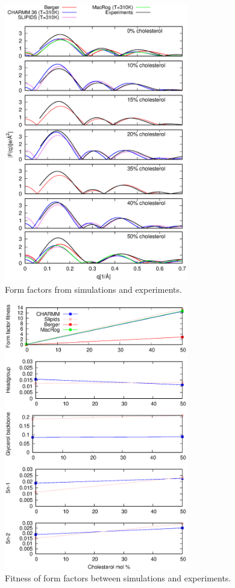 \documentclass[aps,prl,superscriptaddress,twocolumn]{revtex4}
\begin{document}
 \begin{figure}[]
  \centering
  \includegraphics[width=8cm]{../FIGS/FormFactors.eps}
  \caption{\label{FormFactors}
    Form factors from simulations and experiments.
  }
\end{figure}

 \begin{figure}[]
  \centering
  \includegraphics[width=8cm]{../FIGS/FFfitness.eps}
  \caption{\label{FormFactorsFITNESS}
    Fitness of form factors between simulations and experiments.
  }
 \end{figure}
\end{document}
